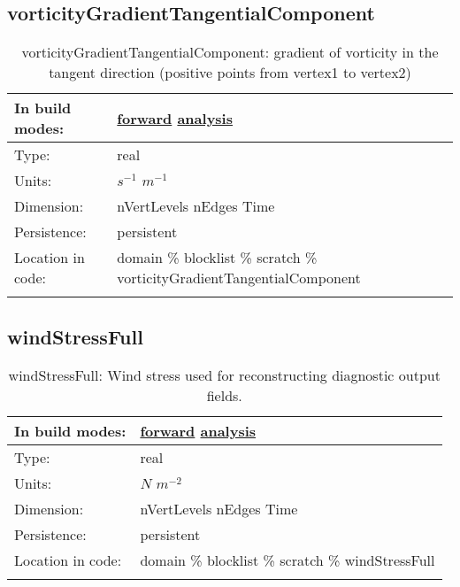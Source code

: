 \subsection[vorticityGradientTangentialComponent]{vorticityGradientTangentialComponent}
\label{subsec:var_sec_scratch_vorticityGradientTangentialComponent}
\begin{center}
\begin{longtable}{| p{2.0in} | p{4.0in} |}
        \hline 
        In build modes: & \hyperref[subsec:forward_var_tab_scratch]{forward} \hyperref[subsec:analysis_var_tab_scratch]{analysis} \\
        \hline 
        Type: & real \\
        \hline 
        Units: & $s^{-1}$ $m^{-1}$ \\
        \hline 
        Dimension: & nVertLevels nEdges Time \\
        \hline 
        Persistence: & persistent \\
        \hline 
		 Location in code: & domain \% blocklist \% scratch \% vorticityGradientTangentialComponent \\
		 \hline 
    \caption{vorticityGradientTangentialComponent: gradient of vorticity in the tangent direction (positive points from vertex1 to vertex2)}
\end{longtable}
\end{center}
\subsection[windStressFull]{windStressFull}
\label{subsec:var_sec_scratch_windStressFull}
\begin{center}
\begin{longtable}{| p{2.0in} | p{4.0in} |}
        \hline 
        In build modes: & \hyperref[subsec:forward_var_tab_scratch]{forward} \hyperref[subsec:analysis_var_tab_scratch]{analysis} \\
        \hline 
        Type: & real \\
        \hline 
        Units: & $N$ $m^{-2}$ \\
        \hline 
        Dimension: & nVertLevels nEdges Time \\
        \hline 
        Persistence: & persistent \\
        \hline 
		 Location in code: & domain \% blocklist \% scratch \% windStressFull \\
		 \hline 
    \caption{windStressFull: Wind stress used for reconstructing diagnostic output fields.}
\end{longtable}
\end{center}
